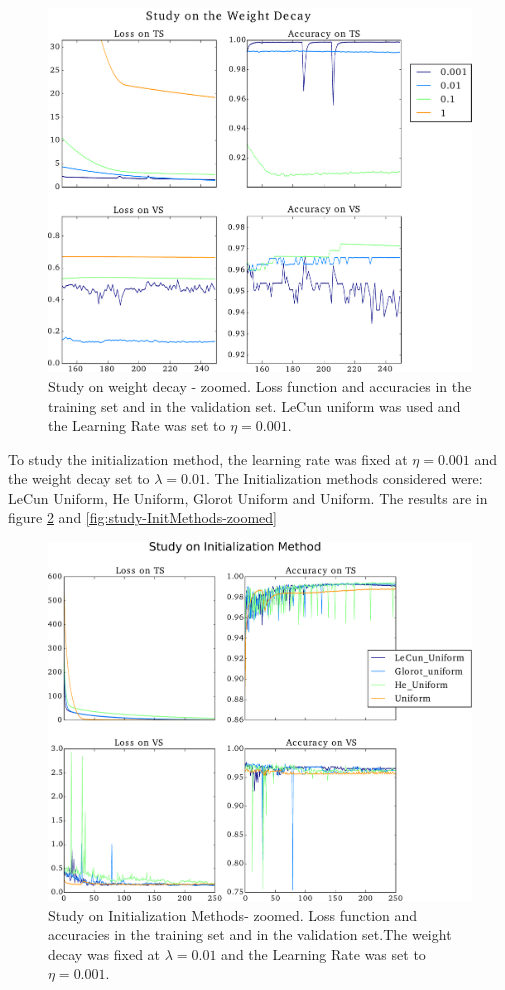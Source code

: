 \documentclass{article}
\begin{document}
\begin{figure}[H]
	\centering
	\includegraphics[width=\linewidth]{study_on_weight_decays_zoomed_v2.pdf}
	\caption{Study on weight decay - zoomed. Loss function and accuracies in the training set and in the validation set. LeCun uniform was used and the Learning Rate was set to $\eta = 0.001$.
}
\label{fig:study-weightdecays-zoomed}
\end{figure}


To study the initialization method, the learning rate was fixed at $\eta = 0.001$ and the weight decay set to $\lambda = 0.01$. The Initialization methods considered were: LeCun Uniform, He Uniform, Glorot Uniform and Uniform. The results are in figure \ref{fig:study-InitMethods} and \ref{fig:study-InitMethods-zoomed}
\begin{figure}[H]
	\centering
	\includegraphics[width=\linewidth]{study_on_initialization_method_v2.pdf}
	\caption{Study on Initialization Methods- zoomed. Loss function and accuracies in the training set and in the validation set.The weight decay was fixed at $\lambda = 0.01$ and the Learning Rate was set to $\eta = 0.001$.
}
\label{fig:study-InitMethods}
\end{figure}
\end{document}
